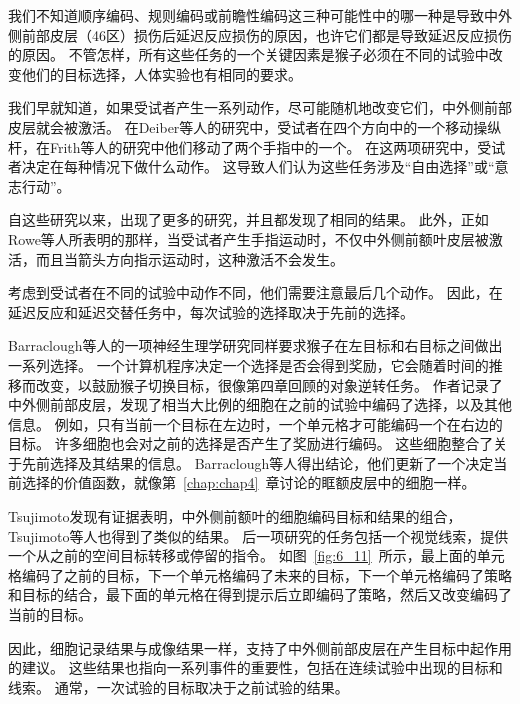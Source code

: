 我们不知道顺序编码、规则编码或前瞻性编码这三种可能性中的哪一种是导致中外侧前部皮层（46区）损伤后延迟反应损伤的原因，也许它们都是导致延迟反应损伤的原因。
不管怎样，所有这些任务的一个关键因素是猴子必须在不同的试验中改变他们的目标选择，人体实验也有相同的要求。


我们早就知道，如果受试者产生一系列动作，尽可能随机地改变它们，中外侧前部皮层就会被激活。
在Deiber等人的研究中\cite{deiber1991cortical}，受试者在四个方向中的一个移动操纵杆，在Frith等人的研究中\cite{frith1991willed}他们移动了两个手指中的一个。
在这两项研究中，受试者决定在每种情况下做什么动作。
这导致人们认为这些任务涉及“自由选择”\cite{playford1992impaired}或“意志行动”\cite{frith1991willed}。


自这些研究以来，出现了更多的研究，并且都发现了相同的结果\cite{frith2000role}。
此外，正如Rowe等人\cite{rowe2005prefrontal}所表明的那样，当受试者产生手指运动时，不仅中外侧前额叶皮层被激活，而且当箭头方向指示运动时，这种激活不会发生。


考虑到受试者在不同的试验中动作不同，他们需要注意最后几个动作。
因此，在延迟反应和延迟交替任务中，每次试验的选择取决于先前的选择。


Barraclough等人\cite{barraclough2004prefrontal}的一项神经生理学研究同样要求猴子在左目标和右目标之间做出一系列选择。
一个计算机程序决定一个选择是否会得到奖励，它会随着时间的推移而改变，以鼓励猴子切换目标，很像第四章回顾的对象逆转任务。
作者记录了中外侧前部皮层，发现了相当大比例的细胞在之前的试验中编码了选择，以及其他信息。
例如，只有当前一个目标在左边时，一个单元格才可能编码一个在右边的目标。
许多细胞也会对之前的选择是否产生了奖励进行编码。
这些细胞整合了关于先前选择及其结果的信息。
Barraclough等人得出结论，他们更新了一个决定当前选择的价值函数，就像第~\ref{chap:chap4}~章讨论的眶额皮层中的细胞一样。


Tsujimoto\cite{tsujimoto2004neuronal,tsujimoto2005neuronal}发现有证据表明，中外侧前额叶的细胞编码目标和结果的组合，Tsujimoto等人\cite{tsujimoto2011comparison}也得到了类似的结果。
后一项研究的任务包括一个视觉线索，提供一个从之前的空间目标转移或停留的指令。
如图~\ref{fig:6_11}~所示，最上面的单元格编码了之前的目标，下一个单元格编码了未来的目标，下一个单元格编码了策略和目标的结合，最下面的单元格在得到提示后立即编码了策略，然后又改变编码了当前的目标。


因此，细胞记录结果与成像结果一样，支持了中外侧前部皮层在产生目标中起作用的建议。
这些结果也指向一系列事件的重要性，包括在连续试验中出现的目标和线索。
通常，一次试验的目标取决于之前试验的结果。


